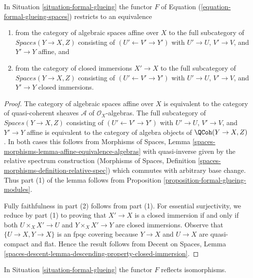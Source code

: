 \begin{lemma}
\label{lemma-equivalence-on-affine}
In Situation \ref{situation-formal-glueing} the functor $F$ of
Equation (\ref{equation-formal-glueing-spaces}) restricts to an
equivalence
\begin{enumerate}
\item from the category of algebraic spaces affine over $X$
to the full subcategory of $\textit{Spaces}(Y \to X, Z)$ consisting
of $(U' \leftarrow V' \rightarrow Y')$ with $U' \to U$, $V' \to V$,
and $Y' \to Y$ affine, and
\item from the category of closed immersions $X' \to X$
to the full subcategory of $\textit{Spaces}(Y \to X, Z)$ consisting
of $(U' \leftarrow V' \rightarrow Y')$ with $U' \to U$, $V' \to V$,
and $Y' \to Y$ closed immersions.
\end{enumerate}
\end{lemma}

\begin{proof}
The category of algebraic spaces affine over $X$ is equivalent to the
category of quasi-coherent sheaves $\mathcal{A}$ of $\mathcal{O}_X$-algebras.
The full subcategory of $\textit{Spaces}(Y \to X, Z)$ consisting of
$(U' \leftarrow V' \rightarrow Y')$ with $U' \to U$, $V' \to V$,
and $Y' \to Y$ affine is equivalent to the category of
algebra objects of $\QCoh(Y \to X, Z)$. In both cases this follows
from Morphisms of Spaces, Lemma
\ref{spaces-morphisms-lemma-affine-equivalence-algebras}
with quasi-inverse given by the relative spectrum construction
(Morphisms of Spaces, Definition
\ref{spaces-morphisms-definition-relative-spec})
which commutes with arbitrary base change. Thus part (1) of the
lemma follows from Proposition \ref{proposition-formal-glueing-modules}.

\medskip\noindent
Fully faithfulness in part (2) follows from part (1). For essential
surjectivity, we reduce by part (1) to proving that $X' \to X$
is a closed immersion if and only if both $U \times_X X' \to U$ and
$Y \times_X X' \to Y$ are closed immersions. Observe that
$\{U \to X, Y \to X\}$ is an fpqc covering
because $Y \to X$ and $U \to X$ are quasi-compact and flat.
Hence the result follows from
Decent on Spaces, Lemma
\ref{spaces-descent-lemma-descending-property-closed-immersion}.
\end{proof}

\begin{lemma}
\label{lemma-reflects-isomorphisms}
In Situation \ref{situation-formal-glueing} the functor $F$
reflects isomorphisms.
\end{lemma}

